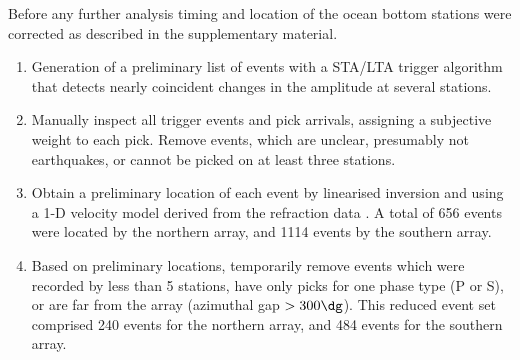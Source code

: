 \documentclass[reviewcopy]{elsart}
\begin{document}
Before any further analysis timing and location of the ocean bottom
stations were corrected as described in the supplementary material.
\begin{enumerate}
\item Generation of  a preliminary list of events
with a STA/LTA trigger algorithm that  detects nearly
coincident changes in the amplitude at several stations.  
\item Manually inspect all trigger events and pick arrivals, assigning
a subjective weight to each pick. Remove
events, which are unclear, presumably not earthquakes, or cannot be
picked on at least three stations. 
\item Obtain a preliminary location of each event by linearised
inversion and using a 1-D velocity model derived from the refraction
data \citep[see supplementary material for velocity
model]{scherwath06}.   %
A total of 656 events were located by the northern array, and 1114
events by the southern array.
\item Based on preliminary locations, temporarily remove events which
  were recorded by less than 5 stations, have only picks for one phase
  type (P or S), or are far from the array (azimuthal gap
  $>300\dg$).
 This reduced event set comprised 240  events for the
  northern array, and 484 events for the southern array.


\end{enumerate}
\end{document}
